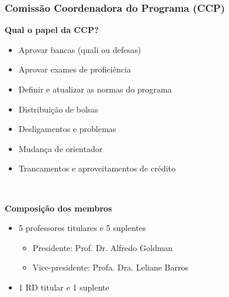 \documentclass{beamer}
\begin{document}
\begin{frame}
  \frametitle{Comissão Coordenadora do Programa (CCP)}

  \textbf{Qual o papel da CCP?}
  \begin{itemize}
    \item Aprovar bancas (quali ou defesas)
    \item Aprovar exames de proficiência
    \item Definir e atualizar as normas do programa
    \item Distribuição de bolsas
    \item Desligamentos e problemas
    \item Mudança de orientador
    \item Trancamentos e aproveitamentos de crédito
  \end{itemize}~\\\pause

  \textbf{Composição dos membros}
  \begin{itemize}
    \item 5 professores titulares e 5 suplentes
    \begin{itemize}
      \item Presidente: Prof. Dr. Alfredo Goldman
      \item Vice-presidente: Profa. Dra. Leliane Barros
    \end{itemize}
    \item 1 RD titular e 1 suplente
  \end{itemize}
\end{frame}
\end{document}
